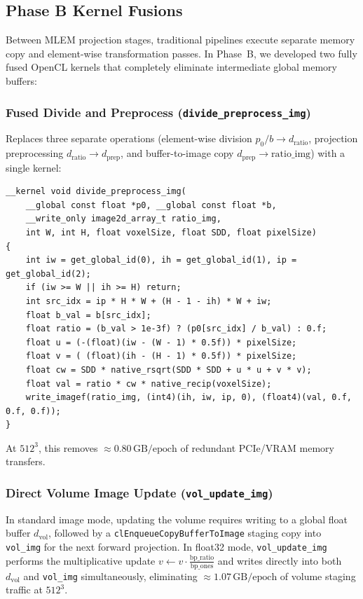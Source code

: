 \documentclass[11pt,a4paper]{article}
\begin{document}
\subsection{Phase B Kernel Fusions}
Between MLEM projection stages, traditional pipelines execute separate memory copy and element-wise transformation passes. In Phase~B, we developed two fully fused OpenCL kernels that completely eliminate intermediate global memory buffers:

\subsubsection{Fused Divide and Preprocess (\texttt{divide\_preprocess\_img})}
Replaces three separate operations (element-wise division $p_0 / b \to d_{\text{ratio}}$, projection preprocessing $d_{\text{ratio}} \to d_{\text{prep}}$, and buffer-to-image copy $d_{\text{prep}} \to \text{ratio\_img}$) with a single kernel:
\begin{lstlisting}
__kernel void divide_preprocess_img(
    __global const float *p0, __global const float *b,
    __write_only image2d_array_t ratio_img,
    int W, int H, float voxelSize, float SDD, float pixelSize)
{
    int iw = get_global_id(0), ih = get_global_id(1), ip = get_global_id(2);
    if (iw >= W || ih >= H) return;
    int src_idx = ip * H * W + (H - 1 - ih) * W + iw;
    float b_val = b[src_idx];
    float ratio = (b_val > 1e-3f) ? (p0[src_idx] / b_val) : 0.f;
    float u = (-(float)(iw - (W - 1) * 0.5f)) * pixelSize;
    float v = ( (float)(ih - (H - 1) * 0.5f)) * pixelSize;
    float cw = SDD * native_rsqrt(SDD * SDD + u * u + v * v);
    float val = ratio * cw * native_recip(voxelSize);
    write_imagef(ratio_img, (int4)(ih, iw, ip, 0), (float4)(val, 0.f, 0.f, 0.f));
}
\end{lstlisting}
At $512^3$, this removes $\approx 0.80\,\text{GB}/\text{epoch}$ of redundant PCIe/VRAM memory transfers.

\subsubsection{Direct Volume Image Update (\texttt{vol\_update\_img})}
In standard image mode, updating the volume requires writing to a global float buffer $d_{\text{vol}}$, followed by a \texttt{clEnqueueCopyBufferToImage} staging copy into \texttt{vol\_img} for the next forward projection. In float32 mode, \texttt{vol\_update\_img} performs the multiplicative update $v \leftarrow v \cdot \frac{\text{bp\_ratio}}{\text{bp\_ones}}$ and writes directly into both $d_{\text{vol}}$ and \texttt{vol\_img} simultaneously, eliminating $\approx 1.07\,\text{GB}/\text{epoch}$ of volume staging traffic at $512^3$.
\end{document}
